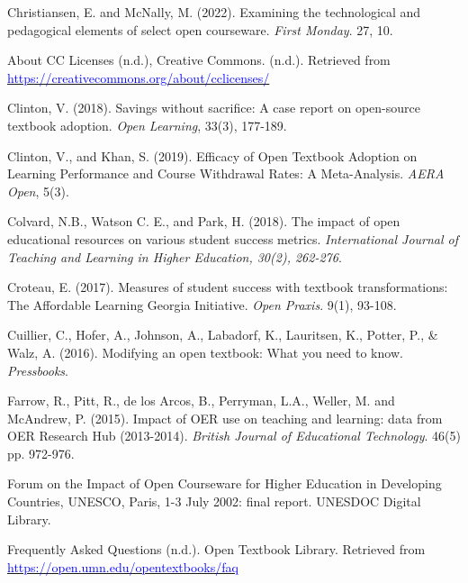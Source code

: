 \documentclass[11pt]{article}
\newcommand{\alink}[2]{\href{#1}{\textcolor{blue}{#2}}}
\begin{document}
\begin{thebibliography}{99}
   Christiansen, E. and McNally, M. (2022). Examining the technological and pedagogical elements of select open courseware. {\em First Monday}. 27, 10.%

   About CC Licenses (n.d.), Creative Commons. (n.d.). Retrieved from \alink{https://creativecommons.org/about/cclicenses/}{https://creativecommons.org/about/cclicenses/}

   Clinton, V. (2018). Savings without sacrifice: A case report on open-source textbook adoption. {\em Open Learning}, 33(3), 177-189.

   Clinton, V., and Khan, S. (2019). Efficacy of Open Textbook Adoption on Learning Performance and Course Withdrawal Rates: A Meta-Analysis. {\em AERA Open}, 5(3).%

 Colvard, N.\/B., Watson C.\/ E., and Park, H. (2018). The impact of open educational resources on various student success metrics. {\em International Journal of Teaching and Learning in Higher Education, 30(2), 262-276}.

 Croteau, E. (2017). Measures of student success with textbook transformations: The Affordable Learning Georgia Initiative. {\em Open Praxis}. 9(1), 93-108.

   Cuillier, C., Hofer, A., Johnson, A., Labadorf, K., Lauritsen, K., Potter, P., \& Walz, A. (2016). Modifying an open textbook: What you need to know.  {\em Pressbooks}.%

   Farrow, R., Pitt, R., de los Arcos, B., Perryman, L.A., Weller, M. and McAndrew, P. (2015). Impact of OER use on teaching and learning: data from OER Research Hub (2013-2014). {\em British Journal of Educational Technology}. 46(5) pp. 972-976.

   Forum on the Impact of Open Courseware for Higher Education in Developing Countries, UNESCO, Paris, 1-3 July 2002: final report.  UNESDOC Digital Library.%

   Frequently Asked Questions (n.d.). Open Textbook Library. Retrieved from \alink{https://open.umn.edu/opentextbooks/faq}{https://open.umn.edu/opentextbooks/faq}


\end{thebibliography}
\end{document}
